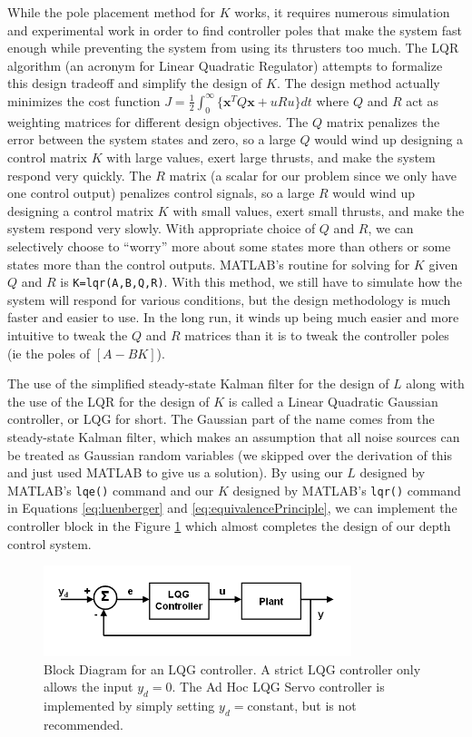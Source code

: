 \documentclass{article}
\begin{document}
While the pole placement method for $K$ works, it requires numerous simulation and experimental work in order to find controller poles that make the system fast enough while preventing the system from using its thrusters too much.  The LQR algorithm (an acronym for Linear Quadratic Regulator) attempts to formalize this design tradeoff and simplify the design of $K$.  The design method actually minimizes the cost function $J=\frac{1}{2}\int_{0}^{\infty}\{\pmb{x}^TQ\pmb{x}+uRu\}dt$ where $Q$ and $R$ act as weighting matrices for different design objectives.  The $Q$ matrix penalizes the error between the system states and zero, so a large $Q$ would wind up designing a control matrix $K$ with large values, exert large thrusts, and make the system respond very quickly.  The $R$ matrix (a scalar for our problem since we only have one control output) penalizes control signals, so a large $R$ would wind up designing a control matrix $K$ with small values, exert small thrusts, and make the system respond very slowly.  With appropriate choice of $Q$ and $R$, we can selectively choose to ``worry'' more about some states more than others or some states more than the control outputs.  MATLAB's routine for solving for $K$ given $Q$ and $R$ is \verb+K=lqr(A,B,Q,R)+.  With this method, we still have to simulate how the system will respond for various conditions, but the design methodology is much faster and easier to use.  In the long run, it winds up being much easier and more intuitive to tweak the $Q$ and $R$ matrices than it is to tweak the controller poles (ie the poles of $[A-BK]$).

The use of the simplified steady-state Kalman filter for the design of $L$ along with the use of the LQR for the design of $K$ is called a Linear Quadratic Gaussian controller, or LQG for short.  The Gaussian part of the name comes from the steady-state Kalman filter, which makes an assumption that all noise sources can be treated as Gaussian random variables (we skipped over the derivation of this and just used MATLAB to give us a solution).  By using our $L$ designed by MATLAB's \verb+lqe()+ command and our $K$ designed by MATLAB's \verb+lqr()+ command in Equations \ref{eq:luenberger} and \ref{eq:equivalencePrinciple}, we can implement the controller block in the Figure \ref{fig:LQGBlockDiagram} which almost completes the design of our depth control system.

\begin{figure}[h]
\includegraphics[width=0.8\textwidth]{LQGBlockDiagram.png}
\centering
\caption{Block Diagram for an LQG controller.  A strict LQG controller only allows the input $y_d=0$.  The Ad Hoc LQG Servo controller is implemented by simply setting $y_d=$constant, but is not recommended.}
\label{fig:LQGBlockDiagram}
\end{figure}
\end{document}
